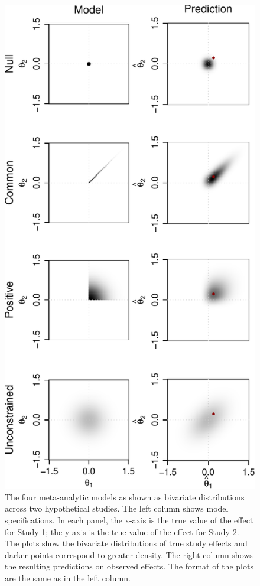 \documentclass[english,man]{apa6}
\theoremstyle{definition}
\theoremstyle{definition}
\theoremstyle{definition}
\theoremstyle{remark}
\begin{document}
\begin{figure}[htbp]
\centering
\includegraphics{p_files/figure-latex/pred-1.pdf}
\caption{\label{fig:pred}The four meta-analytic models as shown as bivariate
distributions across two hypothetical studies. The left column shows
model specifications. In each panel, the x-axis is the true value of the
effect for Study 1; the y-axis is the true value of the effect for Study
2. The plots show the bivariate distributions of true study effects and
darker points correspond to greater density. The right column shows the
resulting predictions on observed effects. The format of the plots are
the same as in the left column.}
\end{figure}
\end{document}
